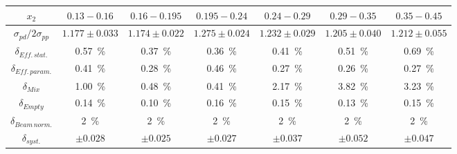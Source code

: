 \begin{tabular}{c|cccccc}
\hline\hline
$x_2$                      & $0.13-0.16$         & $0.16-0.195$        & $0.195-0.24$        & $0.24-0.29$         & $0.29-0.35$         & $0.35-0.45$         \\ \hline
$\sigma_{pd}/2\sigma_{pp}$ & $1.177\pm0.033$     & $1.174\pm0.022$     & $1.275\pm0.024$     & $1.232\pm0.029$     & $1.205\pm0.040$     & $1.212\pm0.055$     \\ \hline
$\delta_{Eff.\,stat.}$     & \SI{0.57}{\percent} & \SI{0.37}{\percent} & \SI{0.36}{\percent} & \SI{0.41}{\percent} & \SI{0.51}{\percent} & \SI{0.69}{\percent} \\
$\delta_{Eff.\,param.}$    & \SI{0.41}{\percent} & \SI{0.28}{\percent} & \SI{0.46}{\percent} & \SI{0.27}{\percent} & \SI{0.26}{\percent} & \SI{0.27}{\percent} \\
$\delta_{Mix}$             & \SI{1.00}{\percent} & \SI{0.48}{\percent} & \SI{0.41}{\percent} & \SI{2.17}{\percent} & \SI{3.82}{\percent} & \SI{3.23}{\percent} \\
$\delta_{Empty}$           & \SI{0.14}{\percent} & \SI{0.10}{\percent} & \SI{0.16}{\percent} & \SI{0.15}{\percent} & \SI{0.13}{\percent} & \SI{0.15}{\percent} \\
$\delta_{Beam\,norm.}$     & \SI{2}{\percent}    & \SI{2}{\percent}    & \SI{2}{\percent}    & \SI{2}{\percent}    & \SI{2}{\percent}    & \SI{2}{\percent}    \\ \hline
$\delta_{syst.}$           & $\pm 0.028$         & $\pm 0.025$         & $\pm 0.027$         & $\pm 0.037$         & $\pm 0.052$         & $\pm 0.047$         \\ \hline\hline
\end{tabular}

